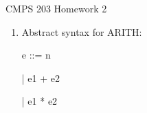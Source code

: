 \documentclass[12pt]{article}
\begin{document}
\centerline{CMPS 203 Homework 2}
\smallskip


\medskip

\begin{enumerate}

\item
Abstract syntax for ARITH:

e ::= n
	
	{|} e1 + e2
	
	{|} e1 * e2

\end{enumerate}
\end{document}
